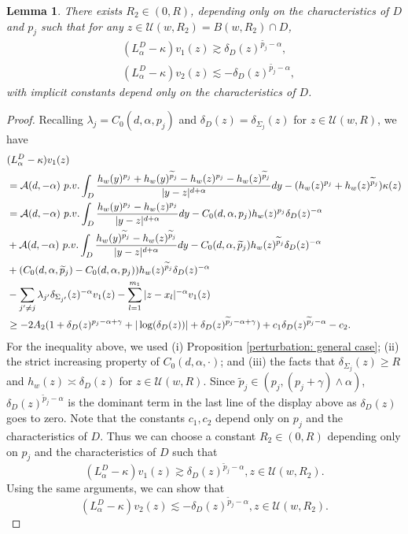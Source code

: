 \documentclass[12pt,a4paper]{amsart}
\numberwithin{equation}{section}
\theoremstyle{plain}
\newcommand{\Si}{\Sigma}
\newcommand{\mc}{\mathcal}
\newcommand{\wt}{\widetilde}
\newcommand{\1}{\mathbbm{1}}
\newtheorem{lemma}[theorem]{Lemma}
\begin{document}
\begin{lemma} \label{test function estimate}
There exists $R_2 \in (0,R)$, depending only on the characteristics 
of $D$ and $p_j$ 
such that for any $z \in \mc U(w,R_2) = B(w,R_2)\cap D$,
\begin{equation}
\begin{aligned}
&(L^D_\alpha-\kappa)
v_1(z) \gtrsim \delta_D(z)^{\wt{p_j} - \alpha}, \\
&(L^D_\alpha-\kappa)
v_2(z) \lesssim -\delta_D(z)^{\wt{p_j} - \alpha},
\end{aligned}
\end{equation}
with implicit constants depend only on the characteristics of $D$.
\end{lemma}
\begin{proof}
Recalling $\lambda_{j} = C_0(d,\alpha,p_j)$ and $\delta_D(z) = \delta_{\Si_j}(z)$ for 
$z\in \mathcal{U}(w, R)$, we have
\begin{align*}
&(L^D_\alpha-\kappa)
v_1(z)\\
& = \mathcal{A}(d,-\alpha){\ \rm p.v.}\int_{D} \frac{h_w(y)^{p_j} + h_w(y)^{\wt p_j}- h_w(z)^{p_j} - h_w(z)^{\wt p_j}}{|y-z|^{d+\alpha}}dy - ( h_w(z)^{p_j} + h_w(z)^{\wt p_j}) \kappa(z) \\
& =\mathcal{A}(d,-\alpha){\ \rm p.v.}\int_{D} \frac{h_w(y)^{p_j}-h_w(z)^{p_j}}{|y-z|^{d+\alpha}}dy - C_0(d,\alpha,p_j) h_w(z)^{p_j} \delta_{D}(z)^{- \alpha} \\
& + \mathcal{A}(d,-\alpha){\ \rm p.v.}\int_{D} \frac{h_w(y)^{\wt p_j}-h_w(z)^{\wt p_j}}{|y-z|^{d+\alpha}}dy - C_0(d,\alpha,\wt p_j) h_w(z)^{\wt p_j} \delta_{D}(z)^{- \alpha} \\
& + (C_0(d,\alpha,\wt p_j) - C_0(d,\alpha,p_j)) h_w(z)^{\wt p_j} \delta_{D}(z)^{- \alpha} \\
& - \sum_{j' \neq j} \lambda_{j'} \delta_{\Si_{j'}}(z)^{-\alpha} v_1(z) - \sum_{l=1}^{m_1} |z - x_l|^{-\alpha} v_1(z)\\
& \ge -2A_2(1+ \delta_D(z)^{p_j-\alpha + \gamma} + |\log(\delta_D(z))| + \delta_D(z)^{\wt p_j-\alpha + \gamma})+ c_1 \delta_D(z)^{\wt p_j-\alpha} - c_2.
\end{align*}
For the inequality above, we used 
(i) Proposition \ref{perturbation: general case}; (ii) the strict increasing property of $C_0(d,\alpha,\cdot)$; and (iii) the facts that
$\delta_{\Si_{j}}(z) \ge R$ and $h_w(z) \asymp \delta_D(z)$ for $z \in \mc U(w,R)$. 
Since $\wt p_j \in (p_j, (p_j+\gamma)\wedge \alpha)$, $\delta_D(z)^{\wt p_j-\alpha}$ is the dominant term in the last line of the display above as $\delta_D(z)$ goes to zero. 
Note that the constants $c_1, c_2$  depend only on $p_j$ and the characteristics of $D$. 
Thus we can choose a constant $R_2 \in (0,R)$ depending only on 
$p_j$ and the characteristics of $D$ such that
$$
(L^D_\alpha-\kappa)
v_1(z) \gtrsim \delta_D(z)^{\wt p_j-\alpha}, z \in \mc U(w, R_2).
$$
Using the same arguments, we can show that 
$$
(L^D_\alpha-\kappa)
v_2(z) \lesssim -\delta_D(z)^{\wt p_j-\alpha}, z \in \mc U(w, R_2).$$
\end{proof}
\end{document}
